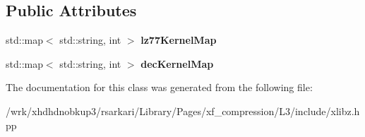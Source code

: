 \subsection*{Public Attributes}
\begin{DoxyCompactItemize}
\item 
\hypertarget{classxlibz_1_1driver_1_1singleton_a33a0a52a05bc7f52b9d8129beeb72927}{std\-::map$<$ std\-::string, int $>$ {\bfseries lz77\-Kernel\-Map}}\label{classxlibz_1_1driver_1_1singleton_a33a0a52a05bc7f52b9d8129beeb72927}

\item 
\hypertarget{classxlibz_1_1driver_1_1singleton_a904eca5767a346b943a51951f12f6baa}{std\-::map$<$ std\-::string, int $>$ {\bfseries dec\-Kernel\-Map}}\label{classxlibz_1_1driver_1_1singleton_a904eca5767a346b943a51951f12f6baa}

\end{DoxyCompactItemize}


The documentation for this class was generated from the following file\-:\begin{DoxyCompactItemize}
\item 
/wrk/xhdhdnobkup3/rsarkari/\-Library/\-Pages/xf\-\_\-compression/\-L3/include/xlibz.\-hpp\end{DoxyCompactItemize}
